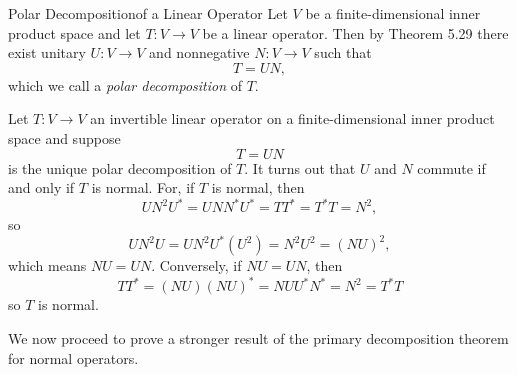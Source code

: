 \documentclass[linearalgebraII]{subfiles}
\begin{document}
    \begin{definition}{Polar Decomposition}{of a Linear Operator}
        Let $V$ be a finite-dimensional inner product space and let $T:V\to V$ be a linear operator. Then by Theorem 5.29 there exist unitary $U:V\to V$ and nonnegative $N:V\to V$ such that
        \begin{equation*}
            T = UN,
        \end{equation*}
        which we call a \emph{polar decomposition} of $T$.
    \end{definition}

    \begin{remark}
        Let $T:V\to V$ an invertible linear operator on a finite-dimensional inner product space and suppose
        \begin{equation*}
            T = UN
        \end{equation*}
        is the unique polar decomposition of $T$. It turns out that $U$ and $N$ commute if and only if $T$ is normal. For, if $T$ is normal, then
        \begin{equation*}
            UN^2U^{*} = UNN^{*} U^{*} = TT^{*} = T^{*} T = N^2,
        \end{equation*}
        so
        \begin{equation*}
            UN^2U = UN^2U^{*} \left( U^2 \right) = N^2U^2 = \left( NU \right) ^2,
        \end{equation*}
        which means $NU = UN$. Conversely, if $NU=UN$, then
        \begin{equation*}
            TT^* = (NU)(NU)^{*} = NUU^{*} N^{*} = N^{2} = T^{*} T
        \end{equation*}
        so $T$ is normal.
    \end{remark}

    \begin{remark}
        We now proceed to prove a stronger result of the primary decomposition theorem for normal operators.
    \end{remark}
\end{document}
